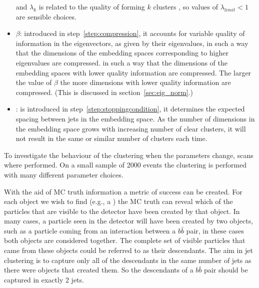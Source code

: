 \begin{itemize}
           and \(\lambda_k\) is related to the quality of forming \(k\)
           clusters \cite{LeeGharanTrevisan2014},
           so values of $\lambda_{\mathrm limit} < 1$ are sensible choices.
       \item  \(\beta\): introduced in step~\ref{step:compression}, it 
          accounts for variable quality of information in the eigenvectors, as given by their eigenvalues,
        in such a way that the dimensions of the embedding spaces 
        corresponding to higher eigenvalues are compressed.
        in such a way that the dimensions of the embedding spaces with lower
        quality information are compressed.
        The larger the value of \(\beta\) the more dimensions with
        lower quality information are compressed.
        (This is discussed in section~\ref{sec:eig_norm}.)
    \item \stoppingdeltar{}: is introduced in step~\ref{step:stoppingcondition}, it
         determines the expected spacing between jets in the embedding space.
         As the number of dimensions in the embedding space grows with increasing 
         number of clear clusters, it will not result in the same or
         similar number of clusters each time.

\end{itemize}


To investigate the behaviour of the clustering when the parameters change, scans where performed.
On a small sample of 2000 events  the clustering is performed with many different parameter choices.

With the aid of MC truth information a metric of success can be created.
For each object we wish to find (e.g., a ) 
the MC truth can reveal which of the particles that are visible to the detector have
been created by that object.
In many cases, a particle seen in the detector will have been created by two objects,
such as a particle coming from an interaction between a \(b\bar{b}\) pair,
in these cases both objects are considered together.
The complete set of visible particles that came from these objects could be referred to as their descendants.
The aim in jet clustering is to capture only all of the descendants in the same number of jets as there were objects that created them.
So the descendants of a \(b\bar{b}\) pair should be captured in exactly 2 jets.

